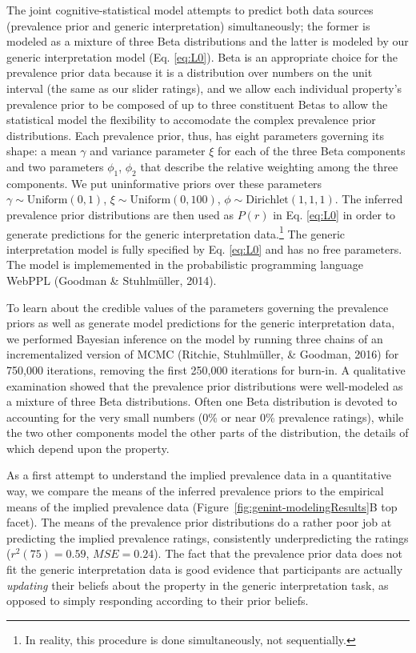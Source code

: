 \documentclass[floatsintext,man]{apa6}
\theoremstyle{definition}
\theoremstyle{definition}
\theoremstyle{definition}
\theoremstyle{remark}
\begin{document}
The joint cognitive-statistical model attempts to predict both data
sources (prevalence prior and generic interpretation) simultaneously;
the former is modeled as a mixture of three Beta distributions and the
latter is modeled by our generic interpretation model (Eq. \ref{eq:L0}).
Beta is an appropriate choice for the prevalence prior data because it
is a distribution over numbers on the unit interval (the same as our
slider ratings), and we allow each individual property's prevalence
prior to be composed of up to three constituent Betas to allow the
statistical model the flexibility to accomodate the complex prevalence
prior distributions. Each prevalence prior, thus, has eight parameters
governing its shape: a mean \(\gamma\) and variance parameter \(\xi\)
for each of the three Beta components and two parameters \(\phi_1\),
\(\phi_2\) that describe the relative weighting among the three
components. We put uninformative priors over these parameters
\(\gamma \sim \text{Uniform}(0, 1)\),
\(\xi \sim \text{Uniform}(0, 100)\),
\(\phi \sim \text{Dirichlet}(1,1,1)\). The inferred prevalence prior
distributions are then used as \(P(r)\) in Eq. \ref{eq:L0} in order to
generate predictions for the generic interpretation data.\footnote{In
  reality, this procedure is done simultaneously, not sequentially.} The
generic interpretation model is fully specified by Eq. \ref{eq:L0} and
has no free parameters. The model is implememented in the probabilistic
programming language WebPPL (Goodman \& Stuhlmüller, 2014).

To learn about the credible values of the parameters governing the
prevalence priors as well as generate model predictions for the generic
interpretation data, we performed Bayesian inference on the model by
running three chains of an incrementalized version of MCMC (Ritchie,
Stuhlmüller, \& Goodman, 2016) for 750,000 iterations, removing the
first 250,000 iterations for burn-in. A qualitative examination showed
that the prevalence prior distributions were well-modeled as a mixture
of three Beta distributions. Often one Beta distribution is devoted to
accounting for the very small numbers (0\% or near 0\% prevalence
ratings), while the two other components model the other parts of the
distribution, the details of which depend upon the property.

As a first attempt to understand the implied prevalence data in a
quantitative way, we compare the means of the inferred prevalence priors
to the empirical means of the implied prevalence data
(Figure~\ref{fig:genint-modelingResults}B top facet). The means of the
prevalence prior distributions do a rather poor job at predicting the
implied prevalence ratings, consistently underpredicting the ratings
(\(r^2(75) = 0.59\), \(MSE = 0.24\)). The fact that the prevalence prior
data does not fit the generic interpretation data is good evidence that
participants are actually \emph{updating} their beliefs about the
property in the generic interpretation task, as opposed to simply
responding according to their prior beliefs.
\end{document}
